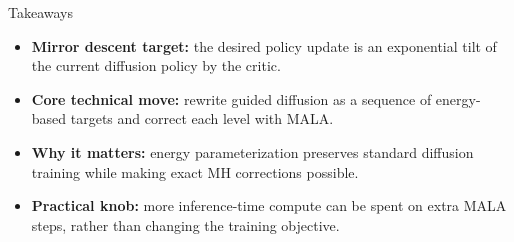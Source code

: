 \documentclass[final,hyperref={pdfpagelabels=false}]{beamer}
\newlength{\colwidth}
\begin{document}
\begin{frame}[t]
\begin{columns}[t]
\begin{column}{\colwidth}
 \vspace{0.8cm}
 
 \begin{alertblock}{\Large Takeaways}
 \small
\begin{itemize}
    \item \textbf{Mirror descent target:} the desired policy update is an exponential tilt of the current diffusion policy by the critic.
    \item \textbf{Core technical move:} rewrite guided diffusion as a sequence of energy-based targets and correct each level with MALA.
    \item \textbf{Why it matters:} energy parameterization preserves standard diffusion training while making exact MH corrections possible.
    \item \textbf{Practical knob:} more inference-time compute can be spent on extra MALA steps, rather than changing the training objective.
\end{itemize}
\end{alertblock}

\end{column}

\end{columns}

\end{frame}
\end{document}
